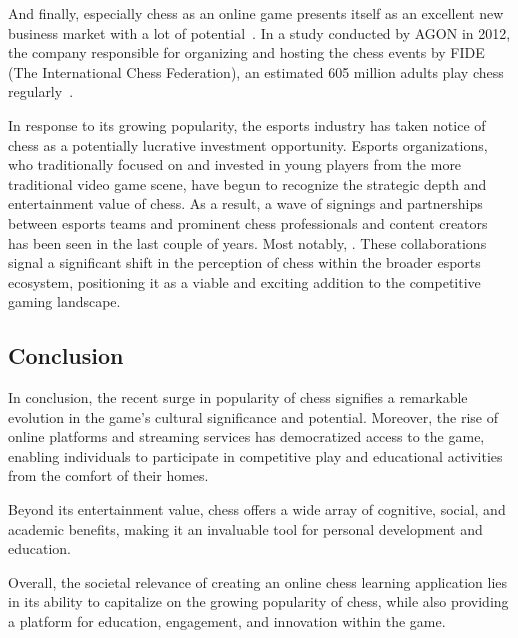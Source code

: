 And finally, especially chess as an online game presents itself as an excellent new business market with a lot of
potential~\cite{business-insider2021}.
In a study conducted by AGON in 2012, the company responsible for organizing and hosting the chess events by FIDE (The
International Chess Federation), an estimated 605 million adults play chess regularly~\cite{chessbase2012}.

In response to its growing popularity, the esports industry has taken notice of chess as a potentially lucrative
investment opportunity.
Esports organizations, who traditionally focused on and invested in young players from the more traditional video game
scene, have begun to recognize the strategic depth and entertainment value of chess.
As a result, a wave of signings and partnerships between esports teams and prominent chess professionals and content
creators has been seen in the last couple of years.
Most notably, .
These collaborations signal a significant shift in the perception of chess within the broader esports ecosystem,
positioning it as a viable and exciting addition to the competitive gaming landscape.


\subsection{Conclusion}\label{subsec:conclusion}

In conclusion, the recent surge in popularity of chess signifies a remarkable evolution in the game's cultural
significance and potential.
Moreover, the rise of online platforms and streaming services has democratized access to the game, enabling individuals
to participate in competitive play and educational activities from the comfort of their homes.

Beyond its entertainment value, chess offers a wide array of cognitive, social, and academic benefits, making it an
invaluable tool for personal development and education.

Overall, the societal relevance of creating an online chess learning application lies in its ability to capitalize on
the growing popularity of chess, while also providing a platform for education, engagement, and innovation within the
game.
